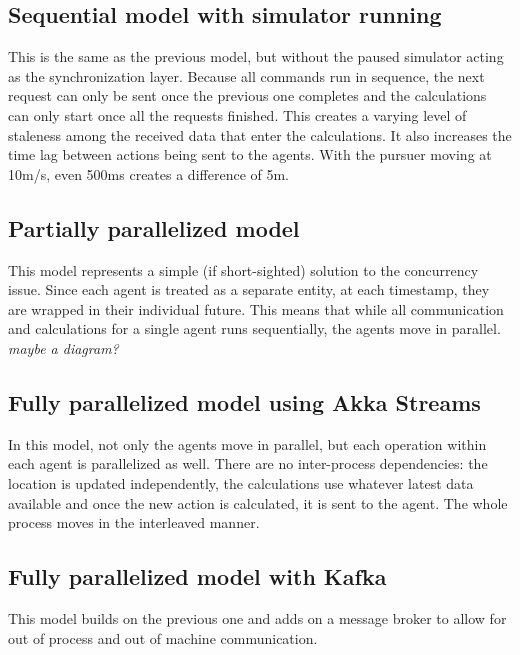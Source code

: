 \documentclass{article}
\begin{document}
\subsection{Sequential model with simulator running}
This is the same as the previous model, but without the paused simulator acting as the synchronization layer. Because all commands run in sequence, the next request can only be sent once the previous one completes and the calculations can only start once all the requests finished. This creates a varying level of staleness among the received data that enter the calculations. It also increases the time lag between actions being sent to the agents. With the pursuer moving at 10m/s, even 500ms creates a difference of 5m.

\subsection{Partially parallelized model}
This model represents a simple (if short-sighted) solution to the concurrency issue. Since each agent is treated as a separate entity, at each timestamp, they are wrapped in their individual future. This means that while all communication and calculations for a single agent runs sequentially, the agents move in parallel. \emph{maybe a diagram?}

\subsection{Fully parallelized model using Akka Streams}
In this model, not only the agents move in parallel, but each operation within each agent is parallelized as well. There are no inter-process dependencies: the location is updated independently, the calculations use whatever latest data available and once the new action is calculated, it is sent to the agent. The whole process moves in the interleaved manner.

\subsection{Fully parallelized model with Kafka}
This model builds on the previous one and adds on a message broker to allow for out of process and out of machine communication. 
\end{document}
